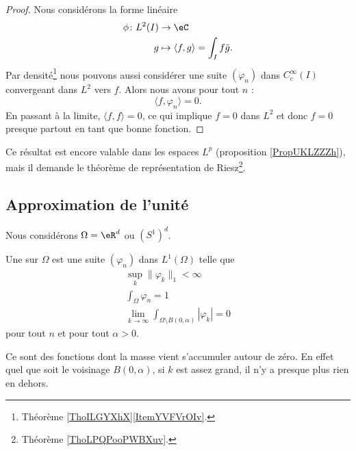 \begin{proof}
    Nous considérons la forme linéaire
    \begin{equation}
        \begin{aligned}
            \phi\colon L^2(I)&\to \eC \\
            g&\mapsto \langle f, g\rangle=\int_If\bar g .
        \end{aligned}
    \end{equation}
    Par densité\footnote{Théorème \ref{ThoILGYXhX}\ref{ItemYVFVrOIv}.} nous pouvons aussi considérer une suite \( (\varphi_n)\) dans \(  C^{\infty}_c(I)\) convergeant dans \( L^2\) vers \( f\). Alors nous avons pour tout \( n\) :
    \begin{equation}
        \langle f, \varphi_n\rangle =0.
    \end{equation}
    En passant à la limite, \( \langle f, f\rangle =0\), ce qui implique \( f=0\) dans \( L^2\) et donc \( f=0\) presque partout en tant que bonne fonction.
\end{proof}
Ce résultat est encore valable dans les espaces \( L^p\) (proposition \ref{PropUKLZZZh}), mais il demande le théorème de représentation de Riesz\footnote{Théorème \ref{ThoLPQPooPWBXuv}.}.

\subsection{Approximation de l'unité}

Nous considérons \( \Omega=\eR^d\) ou \( (S^1)^d\).

\begin{definition}
    Une  sur \( \Omega\) est une suite \( (\varphi_n)\) dans \( L^1(\Omega)\) telle que
    \begin{subequations}
        \begin{align}
            \sup_k \| \varphi_k \|_1 <\infty\\
            \int_{\Omega}\varphi_n=1        \label{subeqAQcisBt}\\
            \lim_{k\to \infty} \int_{\Omega\setminus B(0,\alpha)}| \varphi_k |=0
        \end{align}
    \end{subequations}
    pour tout \( n\) et pour tout \( \alpha>0\).
\end{definition}
Ce sont des fonctions dont la masse vient s'accumuler autour de zéro. En effet quel que soit le voisinage \( B(0,\alpha)\), si \( k\) est assez grand, il n'y a presque plus rien en dehors.

